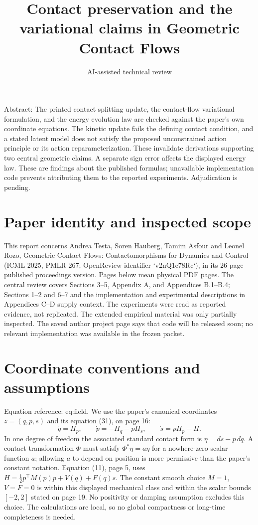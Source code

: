\documentclass[10pt]{article}
\title{Contact preservation and the variational claims in Geometric Contact Flows}
\author{AI-assisted technical review}
\date{}
\begin{document}
\maketitle
Abstract: The printed contact splitting update, the contact-flow variational formulation, and the energy evolution law are checked against the paper’s own coordinate equations. The kinetic update fails the defining contact condition, and a stated latent model does not satisfy the proposed unconstrained action principle or its action reparameterization. These invalidate derivations supporting two central geometric claims. A separate sign error affects the displayed energy law. These are findings about the published formulas; unavailable implementation code prevents attributing them to the reported experiments. Adjudication is pending.\par
\section*{Paper identity and inspected scope}
This report concerns Andrea Testa, Soren Hauberg, Tamim Asfour and Leonel Rozo, Geometric Contact Flows: Contactomorphisms for Dynamics and Control (ICML 2025, PMLR 267; OpenReview identifier `v2nQ1e78Rc`), in its 26-page published proceedings version. Pages below mean physical PDF pages. The central review covers Sections 3–5, Appendix A, and Appendices B.1–B.4; Sections 1–2 and 6–7 and the implementation and experimental descriptions in Appendices C–D supply context. The experiments were read as reported evidence, not replicated. The extended empirical material was only partially inspected. The saved author project page says that code will be released soon; no relevant implementation was available in the frozen packet.\par
\section*{Coordinate conventions and assumptions}
Equation reference: eq:field. We use the paper’s canonical coordinates \(z=(q,p,s)\) and its equation (31), on page 16: \[
 \dot q=H_p,\qquad \dot p=-H_q-pH_s,\qquad \dot s=pH_p-H.\] In one degree of freedom the associated standard contact form is \(\eta=ds-p\,dq\). A contact transformation \(\Phi\) must satisfy \(\Phi^*\eta=a\eta\) for a nowhere-zero scalar function \(a\); allowing \(a\) to depend on position is more permissive than the paper’s constant notation. Equation (11), page 5, uses \(H=\tfrac12 p^\top M(p)p+V(q)+F(q)s\). The constant smooth choice \(M=1\), \(V=F=0\) is within this displayed mechanical class and within the scalar bounds \([-2,2]\) stated on page 19. No positivity or damping assumption excludes this choice. The calculations are local, so no global compactness or long-time completeness is needed.\par
\end{document}
